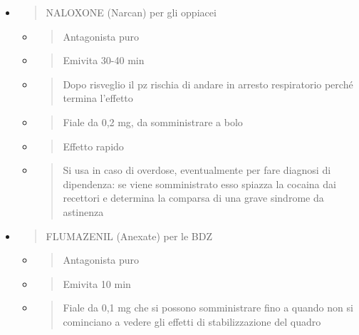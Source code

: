 \documentclass[]{article}
\begin{document}
\begin{itemize}
\item
  \begin{quote}
  NALOXONE (Narcan) per gli oppiacei
  \end{quote}

  \begin{itemize}
  \item
    \begin{quote}
    Antagonista puro
    \end{quote}
  \item
    \begin{quote}
    Emivita 30-40 min
    \end{quote}
  \item
    \begin{quote}
    Dopo risveglio il pz rischia di andare in arresto respiratorio
    perché termina l'effetto
    \end{quote}
  \item
    \begin{quote}
    Fiale da 0,2 mg, da somministrare a bolo
    \end{quote}
  \item
    \begin{quote}
    Effetto rapido
    \end{quote}
  \item
    \begin{quote}
    Si usa in caso di overdose, eventualmente per fare diagnosi di
    dipendenza: se viene somministrato esso spiazza la cocaina dai
    recettori e determina la comparsa di una grave sindrome da astinenza
    \end{quote}
  \end{itemize}
\item
  \begin{quote}
  FLUMAZENIL (Anexate) per le BDZ
  \end{quote}

  \begin{itemize}
  \item
    \begin{quote}
    Antagonista puro
    \end{quote}
  \item
    \begin{quote}
    Emivita 10 min
    \end{quote}
  \item
    \begin{quote}
    Fiale da 0,1 mg che si possono somministrare fino a quando non si
    cominciano a vedere gli effetti di stabilizzazione del quadro
    \end{quote}
  \end{itemize}
\end{itemize}
\end{document}
